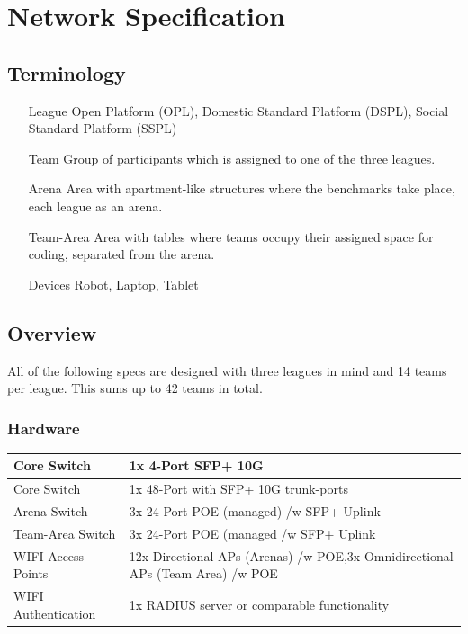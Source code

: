 \chapter[Network Specification]{Network Specification}
\section{Terminology}
\begin{itemize}
\item[League] Open Platform (OPL), Domestic Standard Platform (DSPL), Social Standard Platform (SSPL)
\item[Team] Group of participants which is assigned to one of the three leagues.
\item[Arena] Area with apartment-like structures where the benchmarks take place, each league as an arena.
\item[Team-Area] Area with tables where teams occupy their assigned space for coding, separated from the arena.
\item[Devices] Robot, Laptop, Tablet
\end{itemize}

\section{Overview}
All of the following specs are designed with three leagues in mind and 14 teams per league. This sums up to 42 teams in total.

\subsection{Hardware}

\begin{tabular}{|l|p{12cm}|}
\hline
Core Switch & 1x 4-Port SFP+ 10G \\
\hline
Core Switch & 1x 48-Port with SFP+ 10G trunk-ports \\
\hline
Arena Switch & 3x 24-Port POE (managed) /w SFP+ Uplink \\
\hline
Team-Area Switch & 3x 24-Port POE (managed /w SFP+ Uplink \\
\hline
WIFI Access Points & 12x Directional APs (Arenas) /w POE,\newline 3x Omnidirectional APs (Team Area) /w POE \\
\hline
WIFI Authentication & 1x RADIUS server or comparable functionality \\
\hline
\end{tabular}

